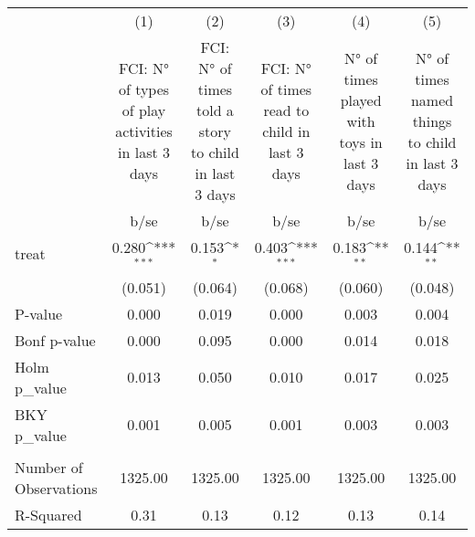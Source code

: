 {
\def\sym#1{\ifmmode^{#1}\else\(^{#1}\)\fi}
\begin{tabular}{l*{5}{c}}
\hline\hline
                    &\multicolumn{1}{c}{(1)}&\multicolumn{1}{c}{(2)}&\multicolumn{1}{c}{(3)}&\multicolumn{1}{c}{(4)}&\multicolumn{1}{c}{(5)}\\
                    &\multicolumn{1}{c}{FCI: N° of types of play activities in last 3 days}&\multicolumn{1}{c}{FCI: N° of times told a story to child in last 3 days}&\multicolumn{1}{c}{FCI: N° of times read to child in last 3 days}&\multicolumn{1}{c}{N° of times played with toys in last 3 days}&\multicolumn{1}{c}{N° of times named things to child in last 3 days}\\
                    &        b/se         &        b/se         &        b/se         &        b/se         &        b/se         \\
\hline
treat               &       0.280\sym{***}&       0.153\sym{*}  &       0.403\sym{***}&       0.183\sym{**} &       0.144\sym{**} \\
                    &     (0.051)         &     (0.064)         &     (0.068)         &     (0.060)         &     (0.048)         \\
\hline
P-value             &       0.000         &       0.019         &       0.000         &       0.003         &       0.004         \\
Bonf p-value        &       0.000         &       0.095         &       0.000         &       0.014         &       0.018         \\
Holm p\_value        &       0.013         &       0.050         &       0.010         &       0.017         &       0.025         \\
BKY p\_value         &       0.001         &       0.005         &       0.001         &       0.003         &       0.003         \\
                    &                     &                     &                     &                     &                     \\
Number of Observations&     1325.00         &     1325.00         &     1325.00         &     1325.00         &     1325.00         \\
R-Squared           &        0.31         &        0.13         &        0.12         &        0.13         &        0.14         \\
\hline\hline
\end{tabular}
}
